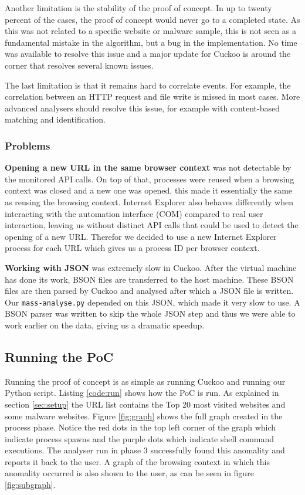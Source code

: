 Another limitation is the stability of the proof of concept. In up to twenty percent of the cases, the proof of concept would never go to a completed state. As this was not related to a specific website or malware sample, this is not seen as a fundamental mistake in the algorithm, but a bug in the implementation. No time was available to resolve this issue and a major update for Cuckoo is around the corner that resolves several known issues.

The last limitation is that it remains hard to correlate events. For example, the correlation between an HTTP request and file write is missed in most cases. More advanced analysers should resolve this issue, for example with content-based matching and identification.

\subsubsection{Problems}
\label{99problems}

\textbf{Opening a new URL in the same browser context} was not detectable by the monitored API calls. On top of that, processes were reused when a browsing context was closed and a new one was opened, this made it essentially the same as reusing the browsing context. Internet Explorer also behaves differently when interacting with the automation interface (COM) compared to real user interaction, leaving us without distinct API calls that could be used to detect the opening of a new URL. Therefor we decided to use a new Internet Explorer process for each URL which gives us a process ID per browser context.

\textbf{Working with JSON} was extremely slow in Cuckoo. After the virtual machine has done its work, BSON files are transferred to the host machine. These BSON files are then parsed by Cuckoo and analysed after which a JSON file is written. Our \texttt{mass-analyse.py} depended on this JSON, which made it very slow to use. A BSON parser was written to skip the whole JSON step and thus we were able to work earlier on the data, giving us a dramatic speedup.

\subsection{Running the PoC}

Running the proof of concept is as simple as running Cuckoo and running our Python script. Listing \ref{code:run} shows how the PoC is run. As explained in section \ref{sec:setup} the URL list contains the Top 20 most visited websites and some malware websites. Figure \ref{fig:graph} shows the full graph created in the process phase. Notice the red dots in the top left corner of the graph which indicate process spawns and the purple dots which indicate shell command executions. The analyser run in phase 3 successfully found this anomality and reports it back to the user. A graph of the browsing context in which this anomality occurred is also shown to the user, as can be seen in figure \ref{fig:subgraph}.

